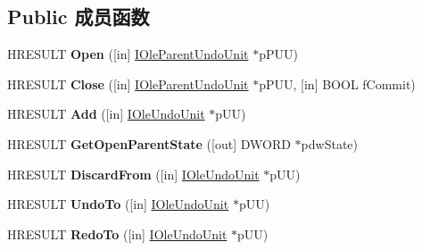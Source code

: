 \subsection*{Public 成员函数}
\begin{DoxyCompactItemize}
\item 
\mbox{\label{interface_i_ole_undo_manager_a55423d99fc2906a83215673c4c98b87c}} 
H\+R\+E\+S\+U\+LT {\bfseries Open} (\mbox{[}in\mbox{]} \hyperlink{interface_i_ole_parent_undo_unit}{I\+Ole\+Parent\+Undo\+Unit} $\ast$p\+P\+UU)
\item 
\mbox{\label{interface_i_ole_undo_manager_adcaf574e3014398b20d6a944080c0b9b}} 
H\+R\+E\+S\+U\+LT {\bfseries Close} (\mbox{[}in\mbox{]} \hyperlink{interface_i_ole_parent_undo_unit}{I\+Ole\+Parent\+Undo\+Unit} $\ast$p\+P\+UU, \mbox{[}in\mbox{]} B\+O\+OL f\+Commit)
\item 
\mbox{\label{interface_i_ole_undo_manager_a87fe9c99e4ca6a2d6d461351563c9d18}} 
H\+R\+E\+S\+U\+LT {\bfseries Add} (\mbox{[}in\mbox{]} \hyperlink{interface_i_ole_undo_unit}{I\+Ole\+Undo\+Unit} $\ast$p\+UU)
\item 
\mbox{\label{interface_i_ole_undo_manager_a2d9a03311d65571928fc91a2866febe3}} 
H\+R\+E\+S\+U\+LT {\bfseries Get\+Open\+Parent\+State} (\mbox{[}out\mbox{]} D\+W\+O\+RD $\ast$pdw\+State)
\item 
\mbox{\label{interface_i_ole_undo_manager_a0fa2e472fa11d018388e9498082c31bc}} 
H\+R\+E\+S\+U\+LT {\bfseries Discard\+From} (\mbox{[}in\mbox{]} \hyperlink{interface_i_ole_undo_unit}{I\+Ole\+Undo\+Unit} $\ast$p\+UU)
\item 
\mbox{\label{interface_i_ole_undo_manager_a8bd13968e00eaaeecb29036bb86d1059}} 
H\+R\+E\+S\+U\+LT {\bfseries Undo\+To} (\mbox{[}in\mbox{]} \hyperlink{interface_i_ole_undo_unit}{I\+Ole\+Undo\+Unit} $\ast$p\+UU)
\item 
\mbox{\label{interface_i_ole_undo_manager_a98b362176c5e305bf9fb8b6d4d0ffe67}} 
H\+R\+E\+S\+U\+LT {\bfseries Redo\+To} (\mbox{[}in\mbox{]} \hyperlink{interface_i_ole_undo_unit}{I\+Ole\+Undo\+Unit} $\ast$p\+UU)

\end{DoxyCompactItemize}
